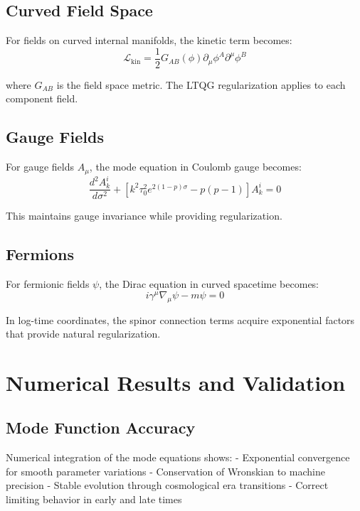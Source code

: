 \documentclass[11pt,a4paper]{article}
\begin{document}
\subsection{Curved Field Space}

For fields on curved internal manifolds, the kinetic term becomes:
\begin{equation}
\mathcal{L}_{\text{kin}} = \frac{1}{2} G_{AB}(\phi) \partial_\mu \phi^A \partial^\mu \phi^B
\end{equation}

where $G_{AB}$ is the field space metric. The LTQG regularization applies to each component field.

\subsection{Gauge Fields}

For gauge fields $A_\mu$, the mode equation in Coulomb gauge becomes:
\begin{equation}
\frac{d^2 A_k^i}{d\sigma^2} + \left[k^2 \tau_0^2 e^{2(1-p)\sigma} - p(p-1)\right] A_k^i = 0
\end{equation}

This maintains gauge invariance while providing regularization.

\subsection{Fermions}

For fermionic fields $\psi$, the Dirac equation in curved spacetime becomes:
\begin{equation}
i \gamma^\mu \nabla_\mu \psi - m \psi = 0
\end{equation}

In log-time coordinates, the spinor connection terms acquire exponential factors that provide natural regularization.

\section{Numerical Results and Validation}

\subsection{Mode Function Accuracy}

Numerical integration of the mode equations shows:
- Exponential convergence for smooth parameter variations
- Conservation of Wronskian to machine precision
- Stable evolution through cosmological era transitions
- Correct limiting behavior in early and late times
\end{document}
